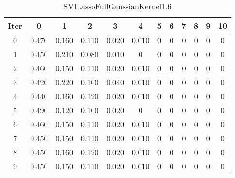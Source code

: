 \begin{table}
	\begin{center}
		\begin{tabular}{|c|c|c|c|c|c|c|c|c|c|c|c|}
			\hline
			Iter & 0 & 1 & 2 & 3 & 4 & 5 & 6 & 7 & 8 & 9 & 10 \\
			\hline
			0 & 0.470 & 0.160 & 0.110 & 0.020 & 0.010 & 0 & 0 & 0 & 0 & 0 & 0 \\
			\hline
			1 & 0.450 & 0.210 & 0.080 & 0.010 & 0 & 0 & 0 & 0 & 0 & 0 & 0 \\
			\hline
			2 & 0.460 & 0.150 & 0.110 & 0.020 & 0.010 & 0 & 0 & 0 & 0 & 0 & 0 \\
			\hline
			3 & 0.420 & 0.220 & 0.100 & 0.040 & 0.010 & 0 & 0 & 0 & 0 & 0 & 0 \\
			\hline
			4 & 0.440 & 0.160 & 0.120 & 0.020 & 0.010 & 0 & 0 & 0 & 0 & 0 & 0 \\
			\hline
			5 & 0.490 & 0.120 & 0.100 & 0.020 & 0 & 0 & 0 & 0 & 0 & 0 & 0 \\
			\hline
			6 & 0.460 & 0.150 & 0.110 & 0.020 & 0.010 & 0 & 0 & 0 & 0 & 0 & 0 \\
			\hline
			7 & 0.450 & 0.150 & 0.110 & 0.020 & 0.010 & 0 & 0 & 0 & 0 & 0 & 0 \\
			\hline
			8 & 0.450 & 0.160 & 0.120 & 0.020 & 0.010 & 0 & 0 & 0 & 0 & 0 & 0 \\
			\hline
			9 & 0.450 & 0.150 & 0.110 & 0.020 & 0.010 & 0 & 0 & 0 & 0 & 0 & 0 \\
			\hline
		\end{tabular}
	\end{center}
	\caption{SVILassoFullGaussianKernel1.6}
\end{table}